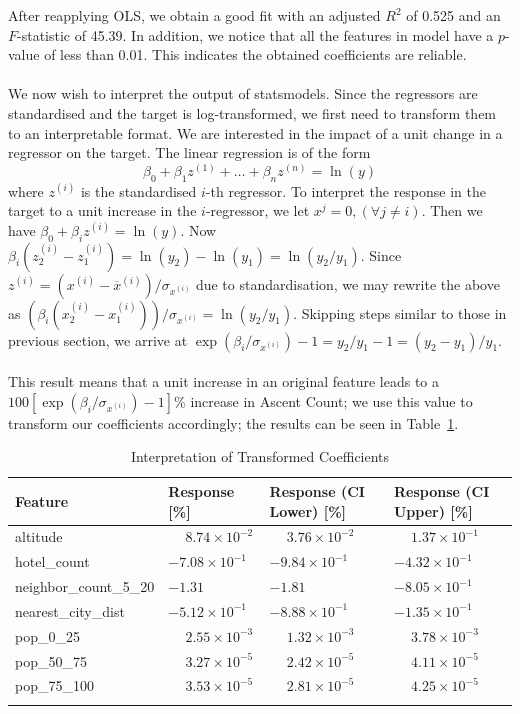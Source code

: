 \documentclass[11pt,a4paper]{article}
\begin{document}
After reapplying OLS, we obtain a good fit with an adjusted $R^{2}$ of 0.525 and an $F$-statistic of 45.39. In addition, we notice that all the features in model have a $p$-value of less than 0.01. This indicates the obtained coefficients are reliable. \\  \\
We now wish to interpret the output of statsmodels. Since the regressors are standardised and the target is log-transformed, we first need to transform them to an interpretable format. We are interested in the impact of a unit change in a regressor on the target. The linear regression is of the form 
$$\beta_0+\beta_1z^{(1)}+ \dots + \beta_n z^{(n)}=\ln(y)$$ 
where $z^{(i)}$ is the standardised $i$-th regressor. To interpret the response in the target to a unit increase in the $i$-regressor, we let $x^j = 0, (\forall j \neq i)$. Then we have $\beta_0 + \beta_i z^{(i)} = \ln(y)$. Now $\beta_i (z_2^{(i)} - z_1^{(i)}) = \ln(y_2) - \ln(y_1)=\ln(y_2/y_1)$. Since 
$z^{(i)} = (x^{(i)} - \overline{x}^{(i)})/\sigma_{x^{(i)}}$
due to standardisation, we may rewrite the above as $(\beta_i (x_2^{(i)} - x_1^{(i)}))/\sigma_{x^{(i)}} =\ln(y_2/y_1)$. Skipping steps similar to those in previous section, we arrive at $\exp(\beta_i / \sigma_{x^{(i)}}) - 1 = y_2 / y_1 - 1 = (y_2 - y_1) / y_1$. \\ \\
This result means that a unit increase in an original feature leads to a $100[\exp(\beta_i / \sigma_{x^{(i)}}) - 1]\%$ increase in Ascent Count; we use this value to transform our coefficients accordingly; the results can be seen in Table~\ref{table:2}.
\begin{table} [h!]
\centering
\caption{Interpretation of Transformed Coefficients}
\begin{tabular}{l l l l}
\toprule
    Feature & 
    Response [\%] & 
    Response (CI Lower) [\%] & 
    Response (CI Upper) [\%] \\
\midrule
altitude & $\phantom{-}8.74 \times 10^{-2}$ & $\phantom{-}3.76\times 10^{-2}$ & $\phantom{-}1.37\times 10^{-1}$ \\
hotel\_count & $-7.08\times 10^{-1}$ & $-9.84\times 10^{-1}$ & $-4.32\times 10^{-1}$ \\
neighbor\_count\_5\_20 & $-1.31$ & $-1.81$ & $-8.05\times 10^{-1}$ \\
nearest\_city\_dist & $-5.12\times 10^{-1}$ & $-8.88\times 10^{-1}$ & $-1.35\times 10^{-1}$ \\
pop\_0\_25 & $\phantom{-}2.55 \times 10^{-3}$ & $\phantom{-}1.32\times 10^{-3}$ & $\phantom{-}3.78\times 10^{-3}$ \\
pop\_50\_75 & $\phantom{-}3.27 \times 10^{-5}$ & $\phantom{-}2.42\times 10^{-5}$ &  $\phantom{-}4.11\times 10^{-5}$ \\
pop\_75\_100 & $\phantom{-}3.53 \times 10^{-5}$ & $\phantom{-}2.81\times 10^{-5}$ &  $\phantom{-}4.25\times 10^{-5}$\\
\bottomrule
\label{table:2}
\end{tabular}
\end{table}
\end{document}
